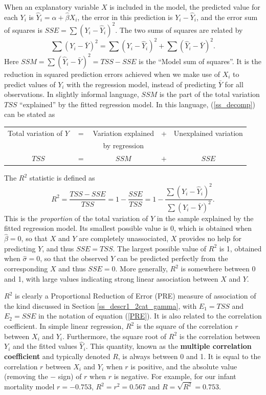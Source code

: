When an explanatory variable $X$ is included in the model, the predicted
value for each $Y_{i}$ is $\hat{Y}_{i}=\hat{\alpha}+\hat{\beta}X_{i}$,
the error in this prediction is $Y_{i}-\hat{Y}_{i}$, and the error sum of
squares is $SSE=\sum (Y_{i}-\hat{Y}_{i})^{2}$. The two
sums of squares are related by
\begin{equation}
\sum (Y_{i}-\bar{Y})^{2} =\sum (Y_{i}-\hat{Y}_{i})^{2} +\sum
(\hat{Y}_{i}-\bar{Y})^{2}.
\label{ss_decomp}
\end{equation}
Here $SSM=\sum (\hat{Y}_{i}-\bar{Y})^{2}=TSS-SSE$ is
the ``Model sum of squares''. It is the reduction in squared
prediction errors achieved when we make use of $X_{i}$ to predict values
of $Y_{i}$ with the regression model,  instead of predicting $\bar{Y}$ for
all
observations. In slightly informal language, $SSM$ is the
part of the total variation $TSS$ ``explained'' by the fitted
regression model. In this language, (\ref{ss_decomp}) can be stated as
\begin{center}
\begin{tabular}{ccccc}
Total variation of $Y$ & = & Variation explained & + & Unexplained
variation  \\
& & by regression & & \\
$TSS$ &  $=$& $SSM$ & $+$& $SSE$
\end{tabular}
\end{center}
The $R^{2}$ statistic is defined as
\begin{equation}
R^{2}= \frac{TSS-SSE}{TSS} = 1-\frac{SSE}{TSS}
=1-\frac{\sum (Y_{i}-\hat{Y}_{i})^{2}}{
\sum (Y_{i}-\bar{Y})^{2}}.
\label{R2}
\end{equation}
This is the \emph{proportion} of the total variation of $Y$ in the sample
explained by the fitted regression model. Its smallest possible value is
0, which is obtained when $\hat{\beta}=0$, so that $X$ and $Y$ are
completely unassociated, $X$ provides no help for predicting $Y$, and
thus $SSE=TSS$. The largest possible value of $R^{2}$ is 1, obtained when
$\hat{\sigma}=0$, so that the observed $Y$ can be predicted perfectly
from the corresponding $X$ and thus $SSE=0$. More generally, $R^{2}$ is
somewhere between 0 and 1, with large values indicating strong linear
association between $X$ and $Y$.

$R^{2}$ is clearly a Proportional Reduction of Error (PRE) measure of
association of the kind discussed in Section
\ref{ss_descr1_2cat_gamma}, with $E_{1}=TSS$ and $E_{2}=SSE$ in the
notation of equation (\ref{PRE}). It is also related to the correlation
coefficient. In simple linear regression, $R^{2}$ is the square of the
correlation $r$ between $X_{i}$ and $Y_{i}$. Furthermore, the square
root of $R^{2}$ is the correlation between $Y_{i}$ and the fitted values
$\hat{Y}_{i}$. This quantity, known as the \textbf{multiple
correlation coefficient} and typically denoted $R$, is always between 0
and 1. It is equal to the correlation $r$ between $X_{i}$ and $Y_{i}$
when $r$ is positive, and the absolute value (removing the $-$ sign) of
$r$ when $r$ is negative. For example, for our infant mortality model
$r=-0.753$, $R^{2}=r^{2}=0.567$ and $R=\sqrt{R^{2}}=0.753$.

